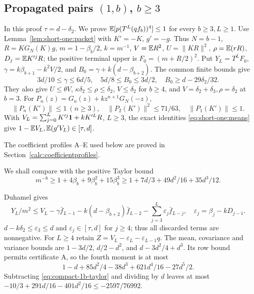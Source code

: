 \subsection[Propagated pairs (1,b), b >= 3]{Propagated pairs $(1,b)$, $b\ge3$}\label{loc:S24}\label{proof:Q4-C127}
In this proof \(\tau=d-\delta_2\).
We prove \(\mathbb E[p(T^L(qf_b))^4]\le1\) for every \(b\ge3,L\ge1\).
Use Lemma~\ref{lem:short-one:packet} with \(K'=-K\), \(g'=-g\).
Thus \(N=b-1\), \(R=KG_N(K)g\), \(m=1-\beta_b/2\), \(k=m^{-1}\),
\(V=\mathbb E R^2\), \(U=\|KR\|^2\), \(\rho=\mathbb E(rR)\), \(D_j=\mathbb E K'^jR\);
the positive terminal upper is \(F_0=(m+R/2)^2\).
Put \(Y_L=T^LF_0\), \(\gamma=k\beta_{b+1}-k^2V/2\), and
\(B_0=\gamma+k(d-\beta_{b+2})\).
The common finite bounds give
\begin{equation}\label{eq:compact-1b-losses}
3d/10\le\gamma\le6d/5,\quad5d/8\le B_0\le3d/2,\quad
B_0\ge d-29\delta_2/32.
\end{equation}
They also give \(U\le\theta V\), \(\kappa\delta_2\le\rho\le\delta_2\),
\(V\le\delta_2\) for \(b\ge4\), and
\(V=\delta_2+\delta_3,\rho=\delta_2\) at \(b=3\).
For \(P_n(z)=G_n(z)+kz^{n+1}G_N(-z)\),
\[
\|P_n(K')\|\le1\ (n\ge3),\quad
\|P_2(K')\|^2\le71/63,\quad \|P_1(K')\|\le1.
\]
With \(V_L=\sum_{j=0}^LK'^j\mathbf1+kK'^LR\), \(L\ge3\),
the exact identities \eqref{eq:short-one:means} give
\(1-\mathbb E V_L,\mathbb E(g'V_L)\in[\tau,d]\).

The coefficient profiles A--E used below are proved in Section~\ref{calc:coefficientprofiles}.

We shall compare with the positive Taylor bound
\begin{equation}\label{eq:compact-1b-taylor}
 m^{-8}\ge1+4\beta_b+9\beta_b^2+15\beta_b^3
 \ge1+7d/3+49d^2/16+35d^3/12.
\end{equation}


Duhamel gives
\[
 Y_L/m^2\le V_L-\gamma \bar f_{L-1}-k(d-\beta_{b+2})\bar f_{L-2}
                   -\sum_{j=3}^L\varepsilon_j\bar f_{L-j},\quad
 \varepsilon_j=\beta_j-kD_{j-1}.
\]
$d-k\delta_{2}\le\varepsilon_3\le d$ and
$\varepsilon_j\in[\tau,d]$ for $j\ge4$; thus all discarded terms
are nonnegative.
For $L\ge4$ retain $Z=V_L-\varepsilon_L-\varepsilon_{L-1}q$.
The mean, covariance and variance bounds are
$1-3d/2$, $d/2-d^2$, and $d-3d^2/4+d^3$.
Its row bound permits certificate A, so the fourth moment is at most
\[
 1-d+85d^2/4-38d^3+621d^4/16-27d^5/2.
\]
Subtracting \eqref{eq:compact-1b-taylor} and dividing by $d$ leaves at most
$-10/3+291d/16-401d^2/16\le-2597/76992$.

